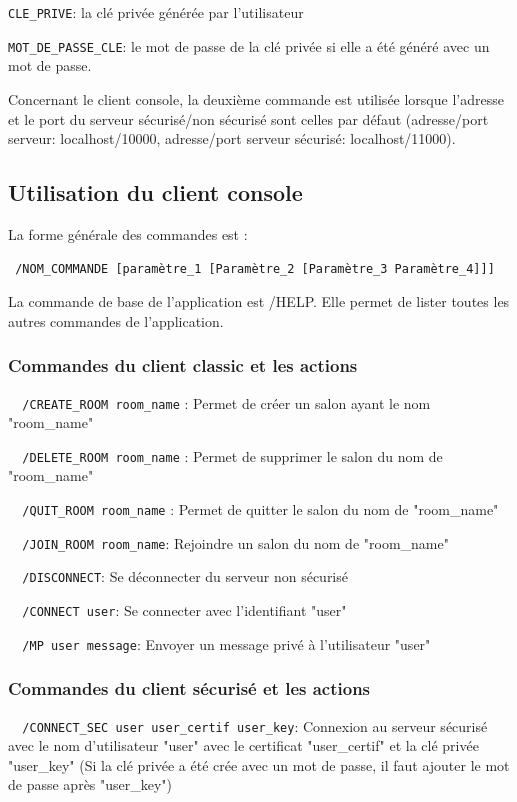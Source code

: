 \documentclass[a4paper,11pt,french]{book}
\begin{document}
\verb+CLE_PRIVE+: la clé privée générée par l'utilisateur

\verb+MOT_DE_PASSE_CLE+: le mot de passe de la clé privée si elle a été généré avec un mot de passe.

	Concernant le client console, la deuxième commande est utilisée lorsque l'adresse et le port du serveur sécurisé/non sécurisé sont celles par défaut (adresse/port serveur: localhost/10000, adresse/port serveur sécurisé: localhost/11000).
	
\subsection{Utilisation du client console}
	
	La forme générale des commandes est : 
	
\verb+ /NOM_COMMANDE [paramètre_1 [Paramètre_2 [Paramètre_3 Paramètre_4]]]+

La commande de base de l'application est /HELP. Elle permet de lister toutes les autres commandes de l'application.
\subsubsection{Commandes du client classic et les actions}

\verb+	/CREATE_ROOM room_name+  : Permet de créer un salon ayant le nom "room\_name"

\verb+	/DELETE_ROOM room_name+ :  Permet de supprimer le salon du nom de "room\_name"

\verb+	/QUIT_ROOM room_name+ :  Permet de quitter le salon du nom de "room\_name"

\verb+	/JOIN_ROOM room_name+:  Rejoindre un salon du nom de "room\_name"

\verb+	/DISCONNECT+: Se déconnecter du serveur non sécurisé

\verb+	/CONNECT user+:  Se connecter avec l'identifiant "user"

\verb+	/MP user message+: Envoyer un message privé à l'utilisateur "user"
			
\subsubsection{Commandes du client sécurisé et les actions}

\verb+	/CONNECT_SEC user user_certif user_key+: Connexion au serveur sécurisé avec le nom d'utilisateur "user" avec le certificat "user\_certif" et la clé privée "user\_key" (Si la clé privée a été crée avec un mot de passe, il faut ajouter le mot de passe après "user\_key")
\end{document}
